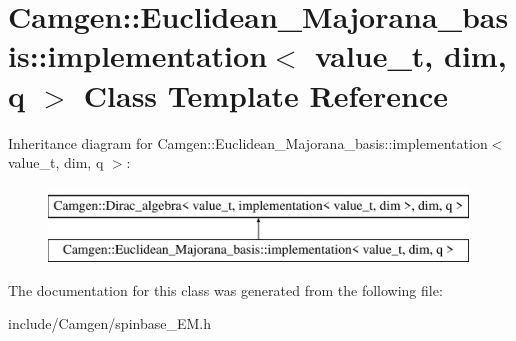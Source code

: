 \hypertarget{a00282}{\section{Camgen\-:\-:Euclidean\-\_\-\-Majorana\-\_\-basis\-:\-:implementation$<$ value\-\_\-t, dim, q $>$ Class Template Reference}
\label{a00282}
}
Inheritance diagram for Camgen\-:\-:Euclidean\-\_\-\-Majorana\-\_\-basis\-:\-:implementation$<$ value\-\_\-t, dim, q $>$\-:\begin{figure}[H]
\begin{center}
\leavevmode
\includegraphics[height=2.000000cm]{a00282}
\end{center}
\end{figure}


The documentation for this class was generated from the following file\-:\begin{DoxyCompactItemize}
\item 
include/\-Camgen/spinbase\-\_\-\-E\-M.\-h\end{DoxyCompactItemize}
